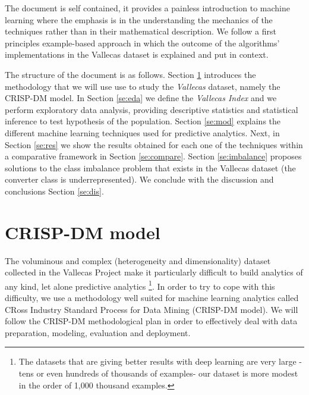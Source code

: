 \documentclass[11pt]{article}
\theoremstyle{definition}
\theoremstyle{remark}
\begin{document}
The document is self contained, it provides a painless introduction to machine learning where the emphasis is in the understanding the mechanics of the techniques rather than in their mathematical description. We follow a first principles example-based approach in which 
the outcome of the algorithms' implementations in the Vallecas dataset is explained and put in context.

The structure of the document is as follows. Section \ref{se:crisp} introduces the methodology that we will use use to study the \emph{Vallecas} dataset, namely the CRISP-DM model. In Section \ref{se:eda} we define the \emph{Vallecas Index} and we perform exploratory data analysis, providing descriptive statistics and statistical inference to test hypothesis of the population. Section \ref{se:mod} explains the different machine learning techniques used for predictive analytics. Next, in Section \ref{se:res} we show the results obtained for each one of the techniques within a comparative framework in Section \ref{se:compare}. Section \ref{se:imbalance} proposes solutions to the class imbalance problem that exists in the Vallecas dataset (the converter class is underrepresented). We conclude with the discussion and conclusions Section \ref{se:dis}.

\section{CRISP-DM model}
\label{se:crisp}

 The voluminous and complex (heterogeneity and dimensionality) dataset collected in the Vallecas Project make it particularly difficult to build analytics of any kind, let alone predictive analytics \footnote{The datasets that are giving better results with deep learning are very large -tens or even hundreds of thousands of examples- our dataset is more modest in the order of 1,000 thousand examples.}. In order to try to cope with this difficulty, we use a methodology well suited for machine learning analytics called CRoss Industry Standard Process for Data Mining (CRISP-DM model). We will follow the CRISP-DM methodological plan in order to effectively deal with data preparation, modeling, evaluation and deployment.
  
\end{document}
